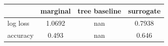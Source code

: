 \begin{tabular}{lccc}
\toprule
 & marginal & tree baseline & surrogate \\
\midrule
log loss & 1.0692 & nan & 0.7938 \\
accuracy & 0.493 & nan & 0.646 \\
\bottomrule
\end{tabular}
